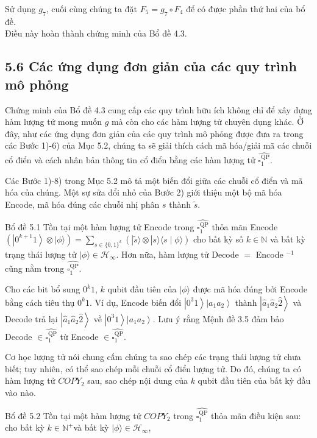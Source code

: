 \documentclass[10pt]{article}
\begin{document}
Sử dụng $g_{7}$, cuối cùng chúng ta đặt $F_{5}=g_{7} \circ F_{4}$ để có được phần thứ hai của bổ đề.\\
Điều này hoàn thành chứng minh của Bổ đề 4.3.

\subsection*{5.6 Các ứng dụng đơn giản của các quy trình mô phỏng}
Chứng minh của Bổ đề 4.3 cung cấp các quy trình hữu ích không chỉ để xây dựng hàm lượng tử mong muốn $g$ mà còn cho các hàm lượng tử chuyên dụng khác. Ở đây, như các ứng dụng đơn giản của các quy trình mô phỏng được đưa ra trong các Bước 1)-6) của Mục 5.2, chúng ta sẽ giải thích cách mã hóa/giải mã các chuỗi cổ điển và cách nhân bản thông tin cổ điển bằng các hàm lượng tử $\widehat{\square_{1}^{\mathrm{QP}}}$.

Các Bước 1)-8) trong Mục 5.2 mô tả một biến đổi giữa các chuỗi cổ điển và mã hóa của chúng. Một sự sửa đổi nhỏ của Bước 2) giới thiệu một bộ mã hóa Encode, mã hóa đúng các chuỗi nhị phân $s$ thành $\tilde{s}$.

Bổ đề 5.1 Tồn tại một hàm lượng tử Encode trong $\widehat{\square_{1}^{\mathrm{QP}}}$ thỏa mãn Encode $\left(\left|0^{k+1} 1\right\rangle \otimes|\phi\rangle\right)= \sum_{s \in\{0,1\}^{k}}(|\tilde{s}\rangle \otimes|s\rangle\langle s \mid \phi\rangle)$ cho bất kỳ số $k \in \mathbb{N}$ và bất kỳ trạng thái lượng tử $|\phi\rangle \in \mathcal{H}_{\infty}$. Hơn nữa, hàm lượng tử Decode $=$ Encode $^{-1}$ cũng nằm trong $\widehat{\square_{1}^{\mathrm{QP}}}$.

Cho các bit bổ sung $0^{k} 1$, $k$ qubit đầu tiên của $|\phi\rangle$ được mã hóa đúng bởi Encode bằng cách tiêu thụ $0^{k} 1$. Ví dụ, Encode biến đổi $\left|0^{3} 1\right\rangle\left|a_{1} a_{2}\right\rangle$ thành $\left|\hat{a}_{1} \hat{a}_{2} \hat{2}\right\rangle$ và Decode trả lại $\left|\hat{a}_{1} \hat{a}_{2} \hat{2}\right\rangle$ về $\left|0^{3} 1\right\rangle\left|a_{1} a_{2}\right\rangle$. Lưu ý rằng Mệnh đề 3.5 đảm bảo Decode $\in \widehat{\square_{1}^{\mathrm{QP}}}$ từ Encode $\in \widehat{\square_{1}^{\mathrm{QP}}}$.

Cơ học lượng tử nói chung cấm chúng ta sao chép các trạng thái lượng tử chưa biết; tuy nhiên, có thể sao chép mỗi chuỗi cổ điển lượng tử. Do đó, chúng ta có hàm lượng tử $C O P Y_{2}$ sau, sao chép nội dung của $k$ qubit đầu tiên của bất kỳ đầu vào nào.

Bổ đề 5.2 Tồn tại một hàm lượng tử $C O P Y_{2}$ trong $\widehat{\square_{1}^{\mathrm{QP}}}$ thỏa mãn điều kiện sau: cho bất kỳ $k \in \mathbb{N}^{+}$và bất kỳ $|\phi\rangle \in \mathcal{H}_{\infty}$,
\end{document}
